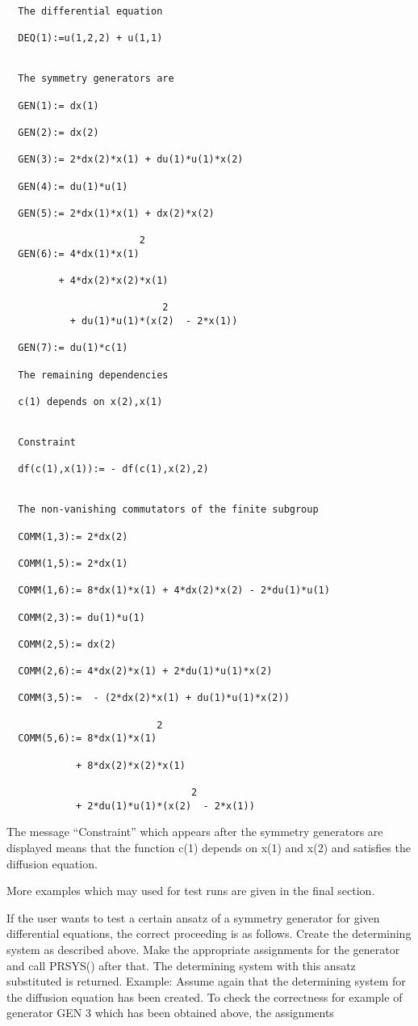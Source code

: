 \begin{verbatim}
  The differential equation

  DEQ(1):=u(1,2,2) + u(1,1)


  The symmetry generators are

  GEN(1):= dx(1)

  GEN(2):= dx(2)

  GEN(3):= 2*dx(2)*x(1) + du(1)*u(1)*x(2)

  GEN(4):= du(1)*u(1)

  GEN(5):= 2*dx(1)*x(1) + dx(2)*x(2)

                       2
  GEN(6):= 4*dx(1)*x(1)

         + 4*dx(2)*x(2)*x(1)

                           2
           + du(1)*u(1)*(x(2)  - 2*x(1))

  GEN(7):= du(1)*c(1)

  The remaining dependencies

  c(1) depends on x(2),x(1)


  Constraint

  df(c(1),x(1)):= - df(c(1),x(2),2)


  The non-vanishing commutators of the finite subgroup

  COMM(1,3):= 2*dx(2)

  COMM(1,5):= 2*dx(1)

  COMM(1,6):= 8*dx(1)*x(1) + 4*dx(2)*x(2) - 2*du(1)*u(1)

  COMM(2,3):= du(1)*u(1)

  COMM(2,5):= dx(2)

  COMM(2,6):= 4*dx(2)*x(1) + 2*du(1)*u(1)*x(2)

  COMM(3,5):=  - (2*dx(2)*x(1) + du(1)*u(1)*x(2))

                          2
  COMM(5,6):= 8*dx(1)*x(1)

            + 8*dx(2)*x(2)*x(1)

                                2
            + 2*du(1)*u(1)*(x(2)  - 2*x(1))
\end{verbatim}

The message ``Constraint'' which appears after the symmetry generators
are displayed means that the function c(1) depends on x(1) and x(2)
and satisfies the diffusion equation.

More examples which may used for test runs are given in the final
section.

If the user wants to test a certain ansatz of a symmetry generator for
given differential equations, the correct proceeding is as follows.
Create the determining system as described above. Make the appropriate
assignments for the generator and call PRSYS() after that.  The
determining system with this ansatz substituted is returned.  Example:
Assume again that the determining system for the diffusion equation
has been created. To check the correctness for example of generator GEN
3 which has been obtained above, the assignments

